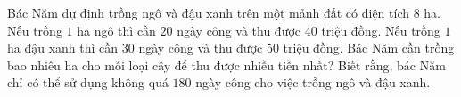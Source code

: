 \begin{bt}%
	Bác Năm dự định trồng ngô và đậu xanh trên một mảnh đất có diện tích $8$ ha. Nếu trồng $1$ ha ngô thì cần $20$ ngày công và thu được $40$ triệu đồng. Nếu trồng $1$ ha đậu xanh thì cần $30$ ngày công và thu được $50$ triệu đồng. Bác Năm cần trồng bao nhiêu ha cho mỗi loại cây để thu được nhiều tiền nhất? Biết rằng, bác Năm chỉ có thể sử dụng không quá $180$ ngày công cho việc trồng ngô và đậu xanh.
\end{bt} 